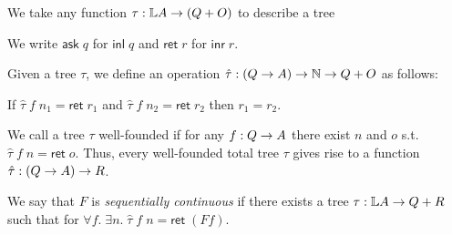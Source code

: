 \documentclass[a4paper,UKenglish,cleveref, autoref, thm-restate]{lipics-v2021}
\begin{document}
\newcommand\R{O}

We take any function $\tau \of \List A \to (Q + \R)$ to describe a tree

\newcommand\ask{\mathsf{ask}\;}
\newcommand\return{\mathsf{ret}\;}
We write $\ask q$ for $\mathsf{inl}\; q$
and $\return r$ for $\mathsf{inr}\; r$.

Given a tree $\tau$, we define an operation $\hat\tau : (Q \to A) \to \nat \to Q + \R$ as follows:
%


\begin{lemma}
  If $\hat \tau\;f\;n_1 = \return r_1$ and $\hat \tau\;f\;n_2 = \return r_2$ then $r_1 = r_2$.
\end{lemma}

We call a tree $\tau$ well-founded if for any $f : Q \to A$
there exist $n$ and $o$ s.t.\ $\hat\tau\;f\;n = \return o$.
Thus, every well-founded total tree $\tau$ gives rise to a function $\hat\tau : (Q \to A) \to R$.

We say that $F$ is \textit{sequentially continuous} if there exists a tree $\tau : \mathbb{L} A \to Q + R$
such that for %
$\forall f.\;\exists n.\; \hat \tau\;f\;n = \return (F f)$.
\end{document}
